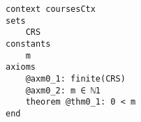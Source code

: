 \documentclass[convert={density=300,size=1080x800,outext=.png}]{standalone}
\begin{document}
\begin{lstlisting}[language=Event-B]
context coursesCtx
sets
	CRS
constants
	m
axioms
	@axm0_1: finite(CRS)
	@axm0_2: m ∈ ℕ1
	theorem @thm0_1: 0 < m
end
\end{lstlisting}
\end{document}
